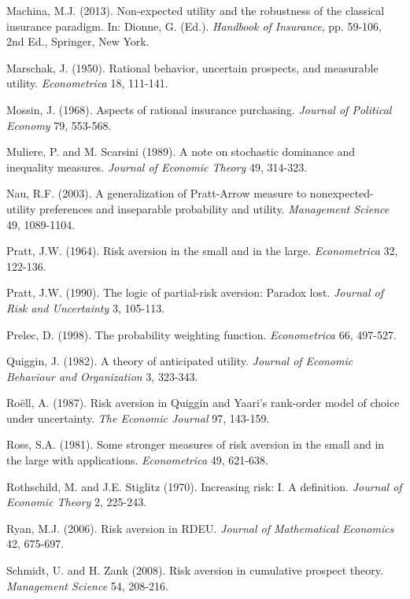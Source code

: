 \documentclass[11pt]{article}
\begin{document}
\begin{spacing}{0.0}
\begin{thebibliography}{99}
{\sc Machina, M.J.} (2013).
Non-expected utility and the robustness of the classical insurance paradigm.
In: Dionne, G. (Ed.).
\textit{Handbook of Insurance},
pp. 59-106, 2nd Ed.,
Springer, New York.

{\sc Marschak, J.} (1950).
Rational behavior, uncertain prospects, and measurable utility.
{\it Econometrica} 18, 111-141.

{\sc Mossin, J.} (1968).
Aspects of rational insurance purchasing.
{\it Journal of Political Economy} 79, 553-568.

{\sc Muliere, P. and M. Scarsini} (1989).
A note on stochastic dominance and inequality measures.
{\it Journal of Economic Theory} 49, 314-323.

{\sc Nau, R.F.} (2003).
A generalization of Pratt-Arrow measure to nonexpected-utility preferences
and inseparable probability and utility.
{\it Management Science} 49, 1089-1104.

{\sc Pratt, J.W.} (1964).
Risk aversion in the small and in the large.
{\it Econometrica} 32, 122-136.

{\sc Pratt, J.W.} (1990).
The logic of partial-risk aversion: Paradox lost.
{\it Journal of Risk and Uncertainty} 3, 105-113.

{\sc Prelec, D.} (1998).
The probability weighting function.
{\it Econometrica} 66, 497-527.

{\sc Quiggin, J.} (1982).
A theory of anticipated utility.
{\it Journal of Economic Behaviour and Organization} 3, 323-343.

{\sc Ro\"ell, A.} (1987).
Risk aversion in Quiggin and Yaari's rank-order model of choice under uncertainty.
{\it The Economic Journal} 97, 143-159.

{\sc Ross, S.A.} (1981).
Some stronger measures of risk aversion in the small and in the large with applications.
{\it Econometrica} 49, 621-638.

{\sc Rothschild, M. and J.E. Stiglitz} (1970).
Increasing risk: I. A definition.
{\it Journal of Economic Theory} 2, 225-243.

{\sc Ryan, M.J.} (2006).
Risk aversion in RDEU.
{\it Journal of Mathematical Economics} 42, 675-697.

{\sc Schmidt, U. and H. Zank} (2008).
Risk aversion in cumulative prospect theory.
{\it Management Science} 54, 208-216.


\end{thebibliography}
\end{spacing}
\end{document}
